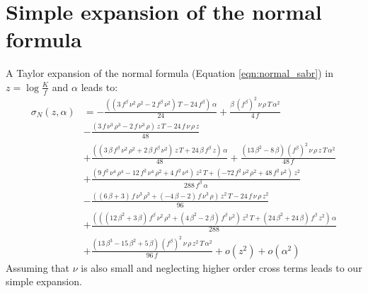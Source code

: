 \documentclass[]{rAMF2e}
\begin{document}
\section{Simple expansion of the normal formula}\label{apx:normal_expansion}
A Taylor expansion of the normal formula (Equation \ref{eqn:normal_sabr}) in $z = \log\frac{K}{f}$ and $\alpha$ leads to:
\begin{align*}
\sigma_N(z, \alpha) &=−\frac{\left( \left( 3\,{f}^{\beta}\,{\nu}^{2}\,{\rho}^{2}−2\,{f}^{\beta}\,{\nu}^{2}\right) \,T-24\,{f}^{\beta}\right) \,\alpha}{24}+\frac{\beta\,{\left( {f}^{\beta}\right) }^{2}\,\nu\,\rho\,T\,{\alpha}^{2}}{4\,f}\\
&-\frac{\left( 3\,f\,{\nu}^{3}\,{\rho}^{3}-2\,f\,{\nu}^{3}\,\rho\right) \,z\,T-24\,f\,\nu\,\rho\,z}{48}\\
&+\frac{\left( \left( 3\,\beta\,{f}^{\beta}\,{\nu}^{2}\,{\rho}^{2}+2\,\beta\,{f}^{\beta}\,{\nu}^{2}\right) \,z\,T+24\,\beta\,{f}^{\beta}\,z\right) \,\alpha}{48}+\frac{\left( 13\,{\beta}^{2}-8\,\beta\right) \,{\left( {f}^{\beta}\right) }^{2}\,\nu\,\rho\,z\,T\,{\alpha}^{2}}{48\,f}\\
&+\frac{\left( 9\,{f}^{2}\,{\nu}^{4}\,{\rho}^{4}-12\,{f}^{2}\,{\nu}^{4}\,{\rho}^{2}+4\,{f}^{2}\,{\nu}^{4}\right) \,{z}^{2}\,T+\left( -72\,{f}^{2}\,{\nu}^{2}\,{\rho}^{2}+48\,{f}^{2}\,{\nu}^{2}\right) \,{z}^{2}}{288\,{f}^{\beta}\,\alpha}
\\&-\frac{\left( \left( 6\,\beta+3\right) \,f\,{\nu}^{3}\,{\rho}^{3}+\left( -4\,\beta-2\right) \,f\,{\nu}^{3}\,\rho\right) \,{z}^{2}\,T-24\,f\,\nu\,\rho\,{z}^{2}}{96}\\
&+\frac{\left( \left( \left( 12\,{\beta}^{2}+3\,\beta\right) \,{f}^{\beta}\,{\nu}^{2}\,{\rho}^{2}+\left( 4\,{\beta}^{2}-2\,\beta\right) \,{f}^{\beta}\,{\nu}^{2}\right) \,{z}^{2}\,T+\left( 24\,{\beta}^{2}+24\,\beta\right) \,{f}^{\beta}\,{z}^{2}\right) \,\alpha}{288}\\
&+\frac{\left( 13\,{\beta}^{3}-15\,{\beta}^{2}+5\,\beta\right) \,{\left( {f}^{\beta}\right) }^{2}\,\nu\,\rho\,{z}^{2}\,T\,{\alpha}^{2}}{96\,f}
 + o(z^2)
 + o(\alpha^2)
\end{align*}
Assuming that $\nu$ is also small and neglecting higher order cross terms leads to our simple expansion.
\end{document}
